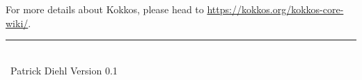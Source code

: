 \documentclass[10pt,landscape]{article}
\def\Year{\expandafter\YEAR\the\year}
\def\YEAR#1#2#3#4{#3#4}
\begin{document}
\begin{multicols}{3}
For more details about Kokkos, please head to \url{https://kokkos.org/kokkos-core-wiki/}.\\
\rule{0.3\linewidth}{0.25pt}
\scriptsize\\
\Year\ Patrick Diehl \textit{\gitAbbrevHash} Version 0.1




\end{multicols}
\end{document}
